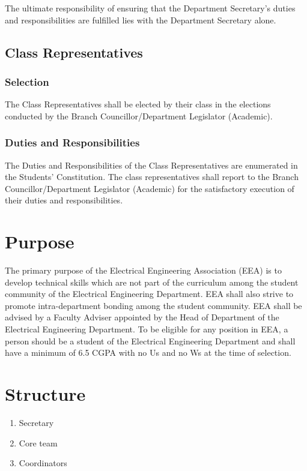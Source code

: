 \documentclass[12pt]{charter}
\begin{document}
The ultimate responsibility of ensuring that the Department Secretary’s duties and responsibilities are fulfilled lies with the Department Secretary alone.

\subsection{Class Representatives}
\subsubsection{Selection}
The Class Representatives shall be elected by their class in the elections conducted by the Branch
Councillor/Department Legislator (Academic).

\subsubsection{Duties and Responsibilities}
The Duties and Responsibilities of the Class Representatives are enumerated in the Students’
Constitution. The class representatives shall report to the Branch Councillor/Department Legislator (Academic) for the satisfactory execution of their duties and responsibilities.

\pagebreak


\section{Purpose}

The primary purpose of the Electrical Engineering Association (EEA) is to develop technical skills which are not part of the curriculum among the student community of the Electrical Engineering Department. EEA shall also strive to promote intra-department bonding among the student community. EEA shall be advised by a Faculty Adviser appointed by the Head of Department of the Electrical Engineering Department. To be eligible for any position in EEA, a person should be a student of the Electrical Engineering Department and shall have a minimum of 6.5 CGPA with no Us and no Ws at the time of selection.

\section{Structure}


\begin{enumerate}
	\item Secretary
	\item Core team
	\item Coordinators
\end{enumerate}
\end{document}
